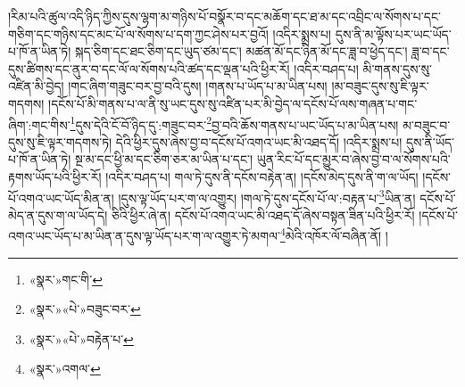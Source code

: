 །རིམ་པའི་ཚུལ་འདི་ཉིད་ཀྱིས་དུས་ལྷག་མ་གཉིས་པོ་བསྣོར་བ་དང་མཆོག་དང་ཐ་མ་དང་འབྲིང་ལ་སོགས་པ་དང་གཅིག་དང་གཉིས་དང་མང་པོ་ལ་སོགས་པ་དག་ཀྱང་ཤེས་པར་བྱའོ། །འདིར་སྨྲས་པ། དུས་ནི་མ་ལྟོས་པར་ཡང་ཡོད་པ་ཁོ་ན་ཡིན་ཏེ། སྐད་ཅིག་དང་ཐང་ཅིག་དང་ཡུད་ཙམ་དང་། མཚན་མོ་དང་ཉིན་མོ་དང་ཟླ་བ་ཕྱེད་དང་། ཟླ་བ་དང་དུས་ཚིགས་དང་ནུར་བ་དང་ལོ་ལ་སོགས་པའི་ཚད་དང་ལྡན་པའི་ཕྱིར་རོ། །འདིར་བཤད་པ། མི་གནས་དུས་སུ་འཛིན་མི་བྱེད། །གང་ཞིག་གཟུང་བར་བྱ་བའི་དུས། །གནས་པ་ཡོད་པ་མ་ཡིན་པས། །མ་བཟུང་དུས་སུ་ཇི་ལྟར་གདགས། །དངོས་པོ་མི་གནས་པ་ལ་ནི་སུ་ཡང་དུས་སུ་འཛིན་པར་མི་བྱེད་ལ་དངོས་པོ་ལས་གཞན་པ་གང་ཞིག་:གང་གིས་\footnote{«སྣར་»གང་གི་}དུས་དེའི་ངོ་བོ་ཉིད་དུ་:གཟུང་བར་\footnote{«སྣར་»«པེ་»བཟུང་བར་}བྱ་བའི་ཆོས་གནས་པ་ཡང་ཡོད་པ་མ་ཡིན་པས། མ་བཟུང་བ་དུས་སུ་ཇི་ལྟར་གདགས་ཏེ། དེའི་ཕྱིར་དུས་ཞེས་བྱ་བ་དངོས་པོ་འགའ་ཡང་མི་འཐད་དོ། །འདིར་སྨྲས་པ། དུས་ནི་ཡོད་པ་ཁོ་ན་ཡིན་ཏེ། སྔ་མ་དང་ཕྱི་མ་དང་ཅིག་ཅར་མ་ཡིན་པ་དང་། ཡུན་རིང་པོ་དང་མྱུར་བ་ཞེས་བྱ་བ་ལ་སོགས་པའི་རྟགས་ཡོད་པའི་ཕྱིར་རོ། །འདིར་བཤད་པ། གལ་ཏེ་དུས་ནི་དངོས་བརྟེན་ན། །དངོས་མེད་དུས་ནི་ག་ལ་ཡོད། །དངོས་པོ་འགའ་ཡང་ཡོད་མིན་ན། །དུས་ལྟ་ཡོད་པར་ག་ལ་འགྱུར། །གལ་ཏེ་དུས་དངོས་པོ་ལ་:བརྟན་པ་\footnote{«སྣར་»«པེ་»བརྟེན་པ་}ཡིན་ན། དངོས་པོ་མེད་ན་དུས་ག་ལ་ཡོད་དེ། ཅིའི་ཕྱིར་ཞེ་ན། དངོས་པོ་འགའ་ཡང་མི་འཐད་དོ་ཞེས་བསྟན་ཟིན་པའི་ཕྱིར་རོ། །དངོས་པོ་འགའ་ཡང་ཡོད་པ་མ་ཡིན་ན་དུས་ལྟ་ཡོད་པར་ག་ལ་འགྱུར་ཏེ་མགལ་\footnote{«སྣར་»འགལ་}མེའི་འཁོར་ལོ་བཞིན་ནོ། །
